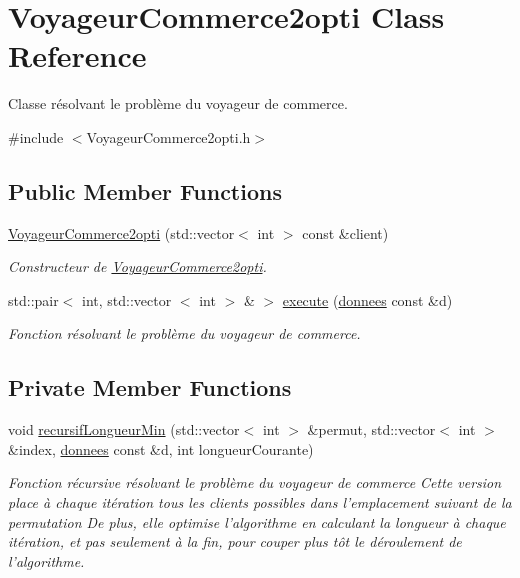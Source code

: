 \hypertarget{classVoyageurCommerce2opti}{\section{\-Voyageur\-Commerce2opti \-Class \-Reference}
\label{classVoyageurCommerce2opti}
}


\-Classe résolvant le problème du voyageur de commerce.  




{\ttfamily \#include $<$\-Voyageur\-Commerce2opti.\-h$>$}

\subsection*{\-Public \-Member \-Functions}
\begin{DoxyCompactItemize}
\item 
\hyperlink{classVoyageurCommerce2opti_a7ef5b64d3dcf8cce690a7c1563c3ca62}{\-Voyageur\-Commerce2opti} (std\-::vector$<$ int $>$ const \&client)
\begin{DoxyCompactList}\small\item\em \-Constructeur de \hyperlink{classVoyageurCommerce2opti}{\-Voyageur\-Commerce2opti}. \end{DoxyCompactList}\item 
std\-::pair$<$ int, std\-::vector\*
$<$ int $>$ \& $>$ \hyperlink{classVoyageurCommerce2opti_a82ef5f5b3ef438c9fb72eeb8174d18bf}{execute} (\hyperlink{structdonnees}{donnees} const \&d)
\begin{DoxyCompactList}\small\item\em \-Fonction résolvant le problème du voyageur de commerce. \end{DoxyCompactList}\end{DoxyCompactItemize}
\subsection*{\-Private \-Member \-Functions}
\begin{DoxyCompactItemize}
\item 
void \hyperlink{classVoyageurCommerce2opti_ad09c507e5414bda90a79a99774ecf5ad}{recursif\-Longueur\-Min} (std\-::vector$<$ int $>$ \&permut, std\-::vector$<$ int $>$ \&index, \hyperlink{structdonnees}{donnees} const \&d, int longueur\-Courante)
\begin{DoxyCompactList}\small\item\em \-Fonction récursive résolvant le problème du voyageur de commerce \-Cette version place à chaque itération tous les clients possibles dans l'emplacement suivant de la permutation \-De plus, elle optimise l'algorithme en calculant la longueur à chaque itération, et pas seulement à la fin, pour couper plus tôt le déroulement de l'algorithme. \end{DoxyCompactList}\end{DoxyCompactItemize}
